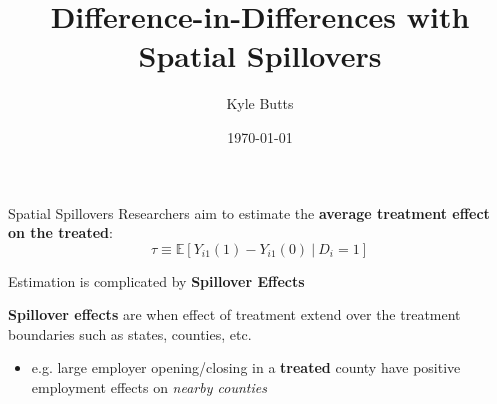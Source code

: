 \documentclass[aspectratio=169]{beamer}
\title{Difference-in-Differences with Spatial Spillovers}
\date{\today}
\author{Kyle Butts}
\begin{document}
\maketitle

\begin{frame}{Spatial Spillovers}
    Researchers aim to estimate the \textbf{average treatment effect on the treated}: 
    \[
        \tau \equiv \mathbb{E} \left[ Y_{i1}(1) - Y_{i1}(0) \ \vert \ D_{i} = 1 \right]
    \]
    
    Estimation is complicated by \textbf{Spillover Effects}
    
    \vspace{5mm}
    \textbf{Spillover effects} are when effect of treatment extend over the treatment boundaries such as states, counties, etc.
    
    \begin{itemize}
        \item e.g. large employer opening/closing in a \textbf{treated} county have positive employment effects on \textit{nearby counties}
    \end{itemize}
\end{frame}
\end{document}

